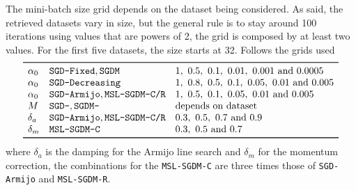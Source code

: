 The mini-batch size grid depends on the dataset being considered. As said, the retrieved datasets vary in size, but the general rule is to stay around 100 iterations using values that are powers of 2, the grid is composed by at least two values. For the first five datasets, the size starts at 32. Follows the grids used
\[
\begin{array}{lll}
\toprule
\alpha_0 & \text{\texttt{SGD-Fixed}}, \text{\texttt{SGDM}} & \numlist{1; 0.5; 0.1; 0.01; 0.001; 0.0005} \\
\alpha_0 & \text{\texttt{SGD-Decreasing}} & \numlist{1; 0.8; 0.5; 0.1; 0.05; 0.01; 0.005} \\
\alpha_0 & \text{\texttt{SGD-Armijo}}, \text{\texttt{MSL-SGDM-C/R}} & \numlist{1; 0.5; 0.1; 0.05; 0.01; 0.005} \\
M & \text{\texttt{SGD-}}, \text{\texttt{SGDM-}} & \text{depends on dataset} \\
\delta_a & \text{\texttt{SGD-Armijo}}, \text{\texttt{MSL-SGDM-C/R}} & \numlist{0.3; 0.5; 0.7; 0.9} \\
\delta_m & \text{\texttt{MSL-SGDM-C}} & \numlist{0.3; 0.5; 0.7} \\
\bottomrule
\end{array}
\]
where $\delta_a$ is the damping for the Armijo line search and $\delta_m$ for the momentum correction, the combinations for the \texttt{MSL-SGDM-C} are three times those of \texttt{SGD-Armijo} and \texttt{MSL-SGDM-R}.

